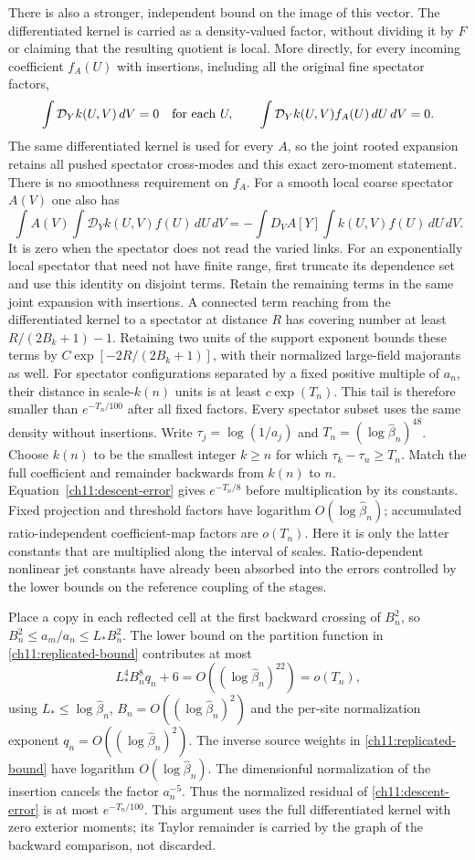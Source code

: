 There is also a stronger, independent bound on the image of this
vector. The differentiated kernel is carried as a density-valued factor, without
dividing it by $F$ or claiming that the resulting quotient is local.
More directly, for every incoming coefficient $f_A(U)$ with insertions,
including all the original fine spectator factors,
\[
 \int \mathcal D_Y k(U,V)\,dV=0
 \quad\hbox{for each }U,\qquad
 \int \mathcal D_Y k(U,V)f_A(U)\,dU\,dV=0.
\]
The same differentiated kernel is used for every $A$, so the joint rooted
expansion retains all pushed spectator cross-modes and this exact
zero-moment statement. There is no smoothness requirement on $f_A$.
For a smooth local coarse spectator $A(V)$ one also has
\[
 \int A(V)\!\int\mathcal D_Y k(U,V)f(U)\,dU\,dV
 =-\int D_VA[Y]\!\int k(U,V)f(U)\,dU\,dV.
\]
It is zero when the spectator does not read the varied links. For an
exponentially local spectator that need not have finite range, first truncate its dependence set
and use this identity on disjoint terms. Retain the remaining terms
in the same joint expansion with insertions. A connected term reaching from
the differentiated kernel to a spectator at distance $R$ has covering number at least
$R/(2B_k+1)-1$. Retaining two units of the support exponent bounds these terms by
$C\exp[-2R/(2B_k+1)]$, with their normalized large-field majorants as well.
For spectator configurations separated by a fixed positive multiple of $a_n$, their
distance in scale-$k(n)$ units is at least $c\exp(T_n)$. This tail
is therefore smaller than $e^{-T_n/100}$ after all fixed factors.
Every spectator subset uses the same density without insertions.
Write $\tau_j=\log(1/a_j)$ and
$T_n=(\log\widehat\beta_n)^{48}$. Choose $k(n)$ to be the smallest
integer $k\ge n$ for which $\tau_k-\tau_n\ge T_n$. Match the full
coefficient and remainder backwards from $k(n)$ to $n$. Equation~\eqref{ch11:descent-error} gives
$e^{-T_n/8}$ before multiplication by its constants. Fixed projection and
threshold factors have logarithm $O(\log\widehat\beta_n)$; accumulated
ratio-independent coefficient-map factors are $o(T_n)$. Here it is only the latter
constants that are multiplied along the interval of scales. Ratio-dependent nonlinear
jet constants have already been absorbed into the errors controlled by the lower bounds on the reference coupling of the stages.

Place a copy in each reflected cell at the first backward crossing of $B_n^2$, so
$B_n^2\le a_m/a_n\le L_*B_n^2$. The lower bound on the partition function
in \eqref{ch11:replicated-bound} contributes at most
\[
 L_*^4B_n^8q_n+6=O((\log\widehat\beta_n)^{22})=o(T_n),
\]
using $L_*\le\log\widehat\beta_n$, $B_n=O((\log\widehat\beta_n)^2)$
and the per-site normalization exponent $q_n=O((\log\widehat\beta_n)^2)$.
The inverse source weights in \eqref{ch11:replicated-bound} have logarithm $O(\log\widehat\beta_n)$.
The dimensionful normalization of the insertion cancels the factor $a_n^{-5}$.
Thus the normalized residual of \eqref{ch11:descent-error} is at most $e^{-T_n/100}$.
This argument uses the full differentiated kernel with zero exterior moments; its Taylor remainder
is carried by the graph of the backward comparison, not discarded.

